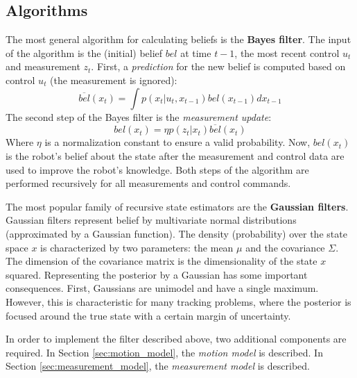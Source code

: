 \subsection{Algorithms}
\label{sec:prob-rob-bayes}
The most general algorithm for calculating beliefs is the \textbf{Bayes filter}.
The input of the algorithm is the (initial) belief $bel$ at time $t-1$, the most recent control $u_t$ and measurement $z_t$.
First, a \textit{prediction} for the new belief is computed based on control $u_t$ (the measurement is ignored):
\begin{equation}
\label{eq:background-theory-bayes-predict}
\overline{bel}(x_t) = \int p(x_t | u_t, x_{t-1}) bel(x_{t-1}) dx_{t-1}
\end{equation}
The second step of the Bayes filter is the \textit{measurement update}:
\begin{equation}
\label{eq:background-theory-bayes-measurement}
bel(x_t) = \eta p(z_t | x_t) \overline{bel}(x_t)
\end{equation}
Where $\eta$ is a normalization constant to ensure a valid probability.
Now, $bel(x_t)$ is the robot's belief about the state after the measurement and control data are used to improve the robot's knowledge.
Both steps of the algorithm are performed recursively for all measurements and control commands.

The most popular family of recursive state estimators are the \textbf{Gaussian filters}.
Gaussian filters represent belief by multivariate normal distributions (approximated by a Gaussian function).
The density (probability) over the state space $x$ is characterized by two parameters: the mean $\mu$ and the covariance $\Sigma$.
The dimension of the covariance matrix is the dimensionality of the state $x$ squared.
Representing the posterior by a Gaussian has some important consequences.
First, Gaussians are unimodel and have a single maximum.
However, this is characteristic for many tracking problems, where the posterior is focused around the true state with a certain margin of uncertainty.

In order to implement the filter described above, two additional components are required.
In Section \ref{sec:motion_model}, the \textit{motion model} is described.
In Section \ref{sec:measurement_model}, the \textit{measurement model} is described.

